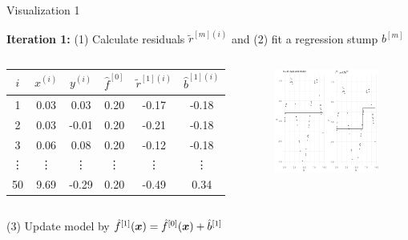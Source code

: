 \begin{vbframe}{Visualization 1}
\begin{footnotesize}
\end{footnotesize}

\framebreak
\begin{footnotesize}
\textbf{Iteration 1:} (1) Calculate residuals $\tilde{r}^{[m](i)}$ and (2) fit a regression stump $b^{[m]}$ %

\begin{columns}

\column{5cm}
\begin{center}
\begin{tabular}{c|c|c|c|c|c}
$i$ & $x^{(i)}$ & $y^{(i)}$ & $\hat{f}^{[0]}$ & $\tilde{r}^{[1](i)}$ & $\hat{b}^{[1](i)}$\\ \hline
1 & 0.03 &  0.03 & 0.20 & -0.17 & -0.18\\
2 & 0.03 & -0.01 & 0.20 & -0.21 & -0.18 \\
3 & 0.06 &  0.08 & 0.20 & -0.12 & -0.18 \\
\vdots & \vdots & \vdots & \vdots  & \vdots & \vdots \\
50 & 9.69 & -0.29 & 0.20 & -0.49 & 0.34\\
\end{tabular}
\end{center}

\column{4.9cm}
\begin{figure}
  \includegraphics[width=\textwidth]{figure_man/gbm_anim_01.png}
\end{figure}
\end{columns}

\vspace*{0.2cm}
(3) Update model by $\hat{f}^{[1]}(\bm{x}) = \hat{f}^{[0]}(\bm{x}) + \hat{b}^{[1]}$
\end{footnotesize}


\end{vbframe}

